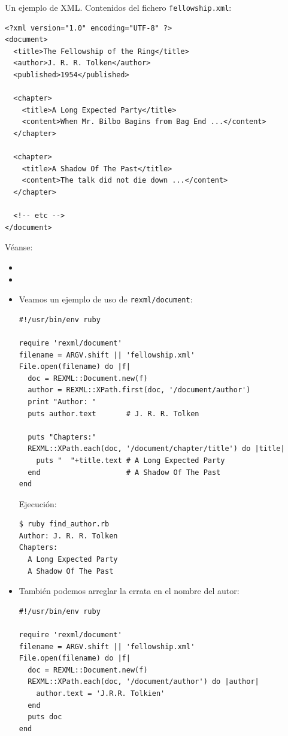 
Un ejemplo de XML. Contenidos del fichero \verb|fellowship.xml|:
\begin{verbatim}
<?xml version="1.0" encoding="UTF-8" ?>
<document>
  <title>The Fellowship of the Ring</title>
  <author>J. R. R. Tolken</author>
  <published>1954</published>
  
  <chapter>
    <title>A Long Expected Party</title>
    <content>When Mr. Bilbo Bagins from Bag End ...</content>
  </chapter>

  <chapter>
    <title>A Shadow Of The Past</title>
    <content>The talk did not die down ...</content>
  </chapter>

  <!-- etc -->
</document>
\end{verbatim}


Véanse:
\begin{itemize}
\item
{}
\item
{}
\item 
Veamos un ejemplo de uso de \verb|rexml/document|:
\begin{verbatim}
#!/usr/bin/env ruby

require 'rexml/document'
filename = ARGV.shift || 'fellowship.xml'
File.open(filename) do |f|
  doc = REXML::Document.new(f)
  author = REXML::XPath.first(doc, '/document/author')
  print "Author: "
  puts author.text       # J. R. R. Tolken

  puts "Chapters:"
  REXML::XPath.each(doc, '/document/chapter/title') do |title|
    puts "  "+title.text # A Long Expected Party
  end                    # A Shadow Of The Past
end
\end{verbatim}

Ejecución:

\begin{verbatim}
$ ruby find_author.rb 
Author: J. R. R. Tolken
Chapters:
  A Long Expected Party
  A Shadow Of The Past
\end{verbatim}

\item 
También podemos arreglar la errata en el nombre del autor:
\begin{verbatim}
#!/usr/bin/env ruby

require 'rexml/document'
filename = ARGV.shift || 'fellowship.xml'
File.open(filename) do |f|
  doc = REXML::Document.new(f)
  REXML::XPath.each(doc, '/document/author') do |author|
    author.text = 'J.R.R. Tolkien'
  end
  puts doc
end
\end{verbatim}
\end{itemize}

